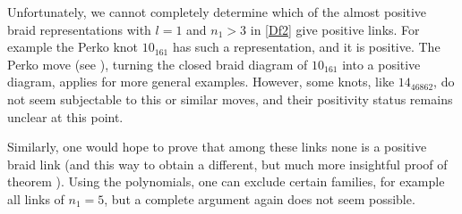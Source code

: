 \begin{rem}\label{rty}
Unfortunately, we cannot completely determine which of the almost
positive braid representations with $l=1$ and $n_1>3$ in \eqref{Df2}
give positive links. For example the Perko knot $10_{161}$ has
such a representation, and it is positive. The Perko move (see
\cite{HTW}), turning the closed braid diagram of $10_{161}$
into a positive diagram, applies for more general examples.
However, some knots, like $14_{46862}$, do not seem subjectable
to this or similar moves, and their positivity status remains
unclear at this point.
\end{rem}

Similarly, one would hope to prove that
among these links none is a positive braid link (and this way
to obtain a different, but much more insightful proof of theorem
). Using the polynomials, one can exclude certain
families, for example all links of $n_1=5$, but a complete argument
again does not seem possible.



